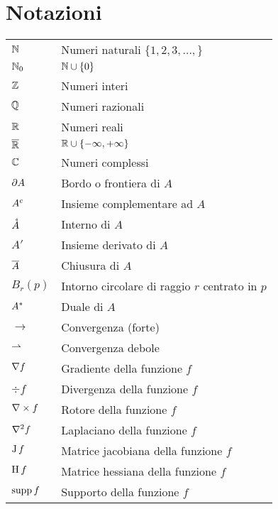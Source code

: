\clearpage
\section*{Notazioni}
\begin{tabular}[h]{ll}
    $\mathbb{N}$                         & Numeri naturali $\{1,2,3,\dotsc,\}$\\
    $\mathbb{N}_0$                       & $\mathbb{N}\cup\{0\}$\\
    $\mathbb{Z}$                         & Numeri interi\\
    $\mathbb{Q}$                         & Numeri razionali\\
    $\mathbb{R}$                         & Numeri reali\\
    $\overline{\mathbb{R}}$                       & $\mathbb{R}\cup\{-\infty,+\infty\}$\\
    $\mathbb{C}$                         & Numeri complessi\\
    $\partial A$                & Bordo o frontiera di $A$\\
    ${A}^c$                  & Insieme complementare ad $A$\\
    $\mathring{A}$               & Interno di $A$\\
    $A'$                         & Insieme derivato di $A$\\
    $\overline{A}$                   & Chiusura di $A$\\
    $B_r(p)$                     & Intorno circolare di raggio $r$ centrato in $p$\\
    $A^{\ast}$                   & Duale di $A$\\
    $\to$                        & Convergenza (forte)\\
    $\rightharpoonup$                    & Convergenza debole\\
    $\nabla f$                    & Gradiente della funzione $f$\\
    $\div f$                     & Divergenza della funzione $f$\\
    $\nabla\times f$                     & Rotore della funzione $f$\\
    $\nabla^2 f$                     & Laplaciano della funzione $f$\\
    $\operatorname{J} f$                     & Matrice jacobiana della funzione $f$\\
    $\operatorname{H} f$                     & Matrice hessiana della funzione $f$\\
    $\operatorname{supp} f$                    & Supporto della funzione $f$\\

\end{tabular}
